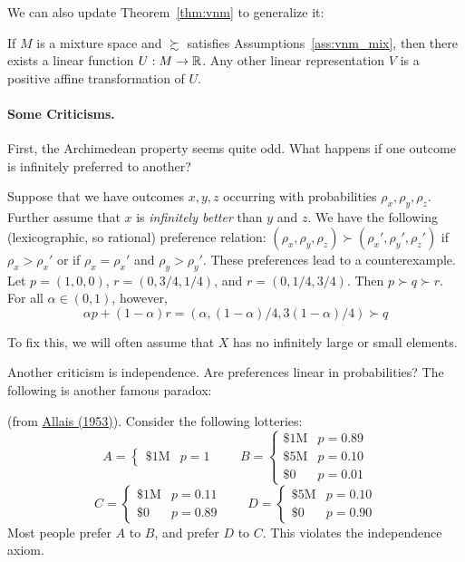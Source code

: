 \documentclass[12pt]{article}
\begin{document}
We can also update Theorem~\ref{thm:vnm} to generalize it:
\begin{theorem}\label{thm:vnm_mix}
	If $M$ is a mixture space and $\succsim$ satisfies Assumptions~\ref{ass:vnm_mix}, then there exists a linear function $U: M \to \mathbb{R}$. Any other linear representation $V$ is a positive affine transformation of $U$.
\end{theorem}

\paragraph{Some Criticisms.} First, the Archimedean property seems quite odd. What happens if one outcome is infinitely preferred to another?

\begin{example}
	Suppose that we have outcomes $x,y,z$ occurring with probabilities $\rho_x,\rho_y,\rho_z$. Further assume that $x$ is \emph{infinitely better} than $y$ and $z$. We have the following (lexicographic, so rational) preference relation: $(\rho_x,\rho_y,\rho_z) \succ(\rho_x',\rho_y',\rho_z')$ if $\rho_x > \rho_x'$ or if $\rho_x = \rho_x'$ and $\rho_y > \rho_y'$. These preferences lead to a counterexample. Let $p = (1,0,0)$, $r = (0,3/4,1/4)$, and $r = (0,1/4,3/4)$. Then $p \succ q \succ r$. For all $\alpha \in (0,1)$, however,
	\[
	\alpha p + (1-\alpha)r = (\alpha, (1-\alpha)/4,3(1-\alpha)/4) \succ q
	\]
\end{example}
To fix this, we will often assume that $X$ has no infinitely large or small elements.

Another criticism is independence. Are preferences linear in probabilities? The following is another famous paradox:

\begin{example}
	 (from \href{https://www.jstor.org/stable/1907921}{Allais (1953)}). Consider the following lotteries:
	\[
	A = \begin{cases}\$1\text{M} & p = 1\end{cases}\qquad B = \begin{cases} \$1\text{M} & p = 0.89 \\ \$5\text{M} & p = 0.10 \\ \$0 & p = 0.01\end{cases}
	\]
	\[
	C = \begin{cases}\$1\text{M} & p = 0.11 \\ \$0 & p = 0.89\end{cases}\qquad D = \begin{cases} \$5\text{M} & p = 0.10 \\  \$0 & p = 0.90\end{cases}
	\]
	Most people prefer $A$ to $B$, and prefer $D$ to $C$. This violates the independence axiom.
\end{example}
\end{document}
